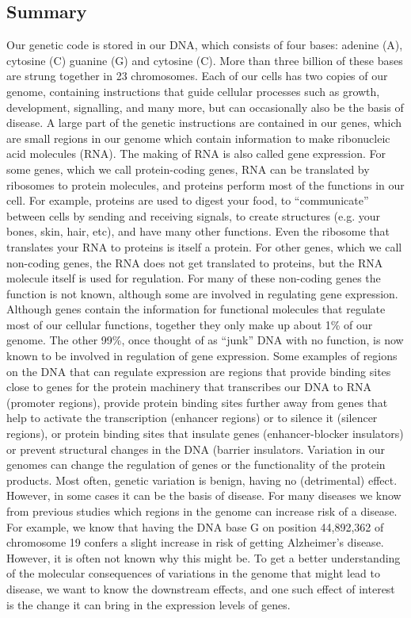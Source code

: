 \begin{appendices}

\chapter{Summary}
Our genetic code is stored in our DNA, which consists of four bases: adenine (A), cytosine (C) guanine (G) and cytosine (C). More than three billion of these bases are strung together in 23 chromosomes. Each of our cells has two copies of our genome, containing instructions that guide cellular processes such as growth, development, signalling, and many more, but can occasionally also be the basis of disease. 
A large part of the genetic instructions are contained in our genes, which are small regions in our genome which contain information to make ribonucleic acid molecules (RNA). The making of RNA is also called gene expression. For some genes, which we call protein-coding genes, RNA can be translated by ribosomes to protein molecules, and proteins perform most of the functions in our cell. For example, proteins are used to digest your food, to “communicate” between cells by sending and receiving signals, to create structures (e.g. your bones, skin, hair, etc), and have many other functions. Even the ribosome that translates your RNA to proteins is itself a protein. For other genes, which we call non-coding genes, the RNA does not get translated to proteins, but the RNA molecule itself is used for regulation. For many of these non-coding genes the function is not known, although some are involved in regulating gene expression.
Although genes contain the information for functional molecules that regulate most of our cellular functions, together they only make up about 1\% of our genome. The other 99\%, once thought of as “junk” DNA with no function, is now known to be involved in regulation of gene expression. Some examples of regions on the DNA that can regulate expression are regions that provide binding sites close to genes for the protein machinery that transcribes our DNA to RNA (promoter regions), provide protein  binding sites further away from genes that help to activate the transcription (enhancer regions) or to silence it (silencer regions), or protein binding sites that insulate genes (enhancer-blocker insulators) or prevent structural changes in the DNA (barrier insulators. 
Variation in our genomes can change the regulation of genes or the functionality of the protein products. Most often, genetic variation is benign, having no (detrimental) effect. However, in some cases it can be the basis of disease. For many diseases we know from previous studies which regions in the genome can increase risk of a disease. For example, we know that having the DNA base G on position 44,892,362 of chromosome 19 confers a slight increase in risk of getting Alzheimer’s disease. However, it is often not known why this might be. 
To get a better understanding of the molecular consequences of variations in the genome that might lead to disease, we want to know the downstream effects, and one such effect of interest is the change it can bring in the expression levels of genes.


\end{appendices}
